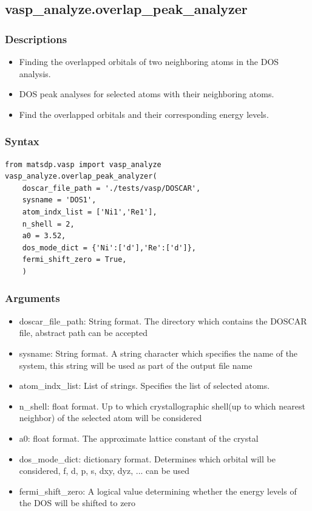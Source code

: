 \documentclass[12pt]{book}
\begin{document}
\subsection{vasp\_analyze.overlap\_peak\_analyzer}
\subsubsection{Descriptions}
\begin{itemize}
\item Finding the overlapped orbitals of two neighboring atoms in the DOS analysis.
\item DOS peak analyses for selected atoms with their neighboring atoms.
\item Find the overlapped orbitals and their corresponding energy levels.	
\end{itemize}

\subsubsection{Syntax}
\begin{lstlisting}
from matsdp.vasp import vasp_analyze
vasp_analyze.overlap_peak_analyzer(
    doscar_file_path = './tests/vasp/DOSCAR',
    sysname = 'DOS1',
    atom_indx_list = ['Ni1','Re1'],
    n_shell = 2,
    a0 = 3.52,
    dos_mode_dict = {'Ni':['d'],'Re':['d']},
    fermi_shift_zero = True,
    )
\end{lstlisting}

\subsubsection{Arguments}
\begin{itemize}
\item doscar\_file\_path: String format. The directory which contains the DOSCAR file, abstract path can be accepted
\item sysname: String format. A string character which specifies the name of the system, this string will be used as part of the output file name
\item atom\_indx\_list: List of strings. Specifies the list of selected atoms.
\item n\_shell: float format. Up to which crystallographic shell(up to which nearest neighbor) of the selected atom will be considered
\item a0: float format. The approximate lattice constant of the crystal
\item dos\_mode\_dict: dictionary format. Determines which orbital will be considered, f, d, p, s, dxy, dyz, ... can be used
\item fermi\_shift\_zero: A logical value determining whether the energy levels of the DOS will be shifted to zero
\end{itemize}
\end{document}
